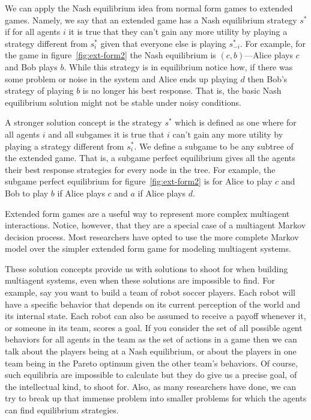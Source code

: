 We can apply the Nash equilibrium idea from normal form games to
extended games. Namely, we say that an extended game has a Nash
equilibrium strategy $s^*$ if for all agents $i$ it is true that they
can't gain any more utility by playing a strategy different from
$s^*_i$ given that everyone else is playing $s^*_{-i}$. For example,
for the game in figure~\ref{fig:ext-form2} the Nash equilibrium is
$(c,b)$---Alice plays $c$ and Bob plays $b$. While this strategy is in
equilibrium notice how, if there was some problem or noise in the
system and Alice ends up playing $d$ then Bob's strategy of playing
$b$ is no longer his best response. That is, the basic Nash
equilibrium solution might not be stable under noisy conditions.

A stronger solution concept is the 
strategy $s^*$ which is defined as one where for all agents $i$ and
all subgames it is true that $i$ can't gain any more utility by
playing a strategy different from $s^*_i$. We define a subgame to be
any subtree of the extended game. That is, a subgame perfect
equilibrium gives all the agents their best response strategies for
every node in the tree. For example, the subgame perfect equilibrium
for figure~\ref{fig:ext-form2} is for Alice to play $c$ and Bob to
play $b$ if Alice plays $c$ and $a$ if Alice plays $d$.

\medskip

Extended form games are a useful way to represent more complex
multiagent interactions. Notice, however, that they are a special case
of a multiagent Markov decision process. Most researchers have opted
to use the more complete Markov model over the simpler extended form
game for modeling multiagent systems.

These solution concepts provide us with solutions to shoot for when
building multiagent systems, even when these solutions are impossible
to find. For example, say you want to build a team of robot soccer
players. Each robot will have a specific behavior that depends on its
current perception of the world and its internal state. Each robot can
also be assumed to receive a payoff whenever it, or someone in its
team, scores a goal. If you consider the set of all possible agent
behaviors for all agents in the team as the set of actions in a game
then we can talk about the players being at a Nash equilibrium, or
about the players in one team being in the Pareto optimum given the
other team's behaviors. Of course, such equilibria are impossible to
calculate but they do give us a precise goal, of the intellectual
kind, to shoot for. Also, as many researchers have done, we can try to
break up that immense problem into smaller problems for which the
agents can find equilibrium strategies.

